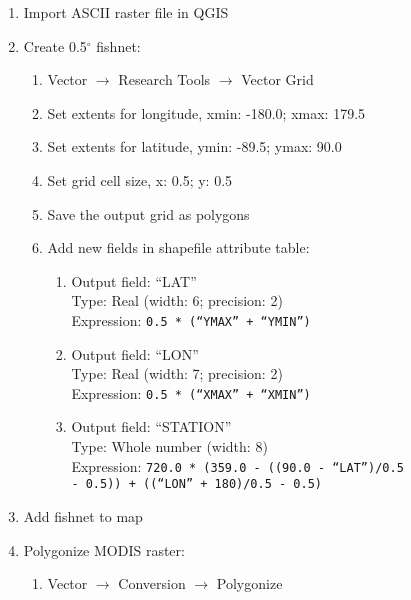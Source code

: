 \begin{enumerate}
    \item Import ASCII raster file in QGIS
    \item Create 0.5$^{\circ}$ fishnet:
    \begin{enumerate}
        \item Vector $\rightarrow$ Research Tools $\rightarrow$ Vector Grid
        \item Set extents for longitude, xmin: -180.0; xmax: 179.5
        \item Set extents for latitude, ymin: -89.5; ymax: 90.0 
        \item Set grid cell size, x: 0.5; y: 0.5
        \item Save the output grid as polygons
        \item Add new fields in shapefile attribute table:
        \begin{enumerate}
            \item Output field: ``LAT''\\
                  Type: Real (width: 6; precision: 2)\\
                  Expression: \texttt{0.5 * (``YMAX'' + ``YMIN'')}
            \item Output field: ``LON''\\
                  Type: Real (width: 7; precision: 2)\\
                  Expression: \texttt{0.5 * (``XMAX'' + ``XMIN'')}
            \item Output field: ``STATION''\footnotemark\\
                  Type: Whole number (width: 8)\\
                  Expression: \texttt{720.0 * (359.0 - ((90.0 - ``LAT'')/0.5 \\
                  - 0.5)) + ((``LON'' + 180)/0.5 - 0.5)}
        \end{enumerate}
    \end{enumerate}
    \item Add fishnet to map
    \item Polygonize MODIS raster:
    \begin{enumerate}
        \item Vector $\rightarrow$ Conversion $\rightarrow$ Polygonize

\end{enumerate}
\end{enumerate}
